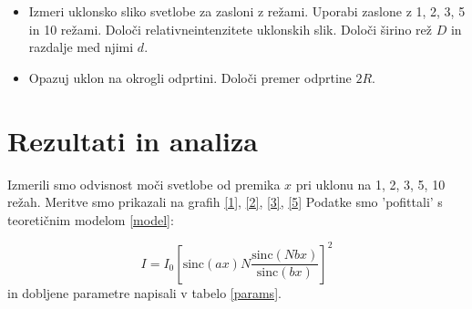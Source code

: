 \documentclass[12pt]{article}
\begin{document}
\begin{itemize}
    \item Izmeri uklonsko sliko svetlobe za zasloni z režami. Uporabi zaslone z 1, 2, 3, 5 in 10 režami. Določi relativneintenzitete uklonskih slik. Določi širino rež $D$ in razdalje med njimi $d$.
    \item Opazuj uklon na okrogli odprtini. Določi premer odprtine $2R$.
\end{itemize}
\newpage
\section{Rezultati in analiza}

Izmerili smo odvisnost moči svetlobe od premika $x$ pri uklonu na 1, 2, 3, 5, 10 režah. Meritve smo prikazali na grafih \ref{1}, \ref{2}, \ref{3}, \ref{5}
Podatke smo 'pofittali' s teoretičnim modelom \ref{model}:

\begin{equation}
    I = I_0 \left[\text{sinc}(ax)N \frac{\text{sinc}(Nbx)}{\text{sinc}(bx)}\right]^2
    \label{model}
\end{equation}
in dobljene parametre napisali v tabelo \ref{params}.
\end{document}
